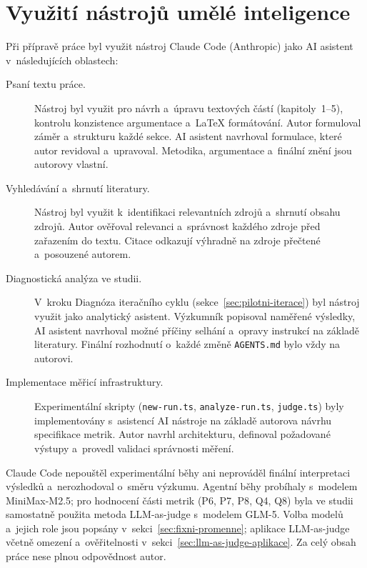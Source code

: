 \chapter{Využití nástrojů umělé inteligence}
\label{app:ai-disclosure}

Při přípravě práce byl využit nástroj Claude Code (Anthropic) jako
AI asistent v~následujících oblastech:

\begin{description}
    \item[Psaní textu práce.]
        Nástroj byl využit pro návrh a~úpravu textových částí
        (kapitoly~1--5), kontrolu konzistence argumentace a~LaTeX
        formátování. Autor formuloval záměr a~strukturu každé sekce.
        AI asistent navrhoval formulace, které autor revidoval
        a~upravoval. Metodika, argumentace a~finální znění jsou
        autorovy vlastní.

    \item[Vyhledávání a~shrnutí literatury.]
        Nástroj byl využit k~identifikaci relevantních zdrojů
        a~shrnutí obsahu zdrojů. Autor ověřoval relevanci a~správnost
        každého zdroje před zařazením do textu. Citace odkazují
        výhradně na zdroje přečtené a~posouzené autorem.

    \item[Diagnostická analýza ve studii.]
        V~kroku Diagnóza iteračního cyklu (sekce~\ref{sec:pilotni-iterace})
        byl nástroj využit jako analytický asistent. Výzkumník
        popisoval naměřené výsledky, AI asistent navrhoval možné
        příčiny selhání a~opravy instrukcí na základě literatury.
        Finální rozhodnutí o~každé změně \texttt{AGENTS.md} bylo
        vždy na autorovi.

    \item[Implementace měřicí infrastruktury.]
        Experimentální skripty (\texttt{new-\allowbreak run.ts},
        \texttt{analyze-\allowbreak run.ts}, \texttt{judge.ts}) byly
        implementovány s~asistencí AI nástroje na základě autorova
        návrhu specifikace metrik. Autor navrhl architekturu,
        definoval požadované výstupy a~provedl validaci správnosti
        měření.
\end{description}

\noindent
Claude Code nepouštěl experimentální běhy ani neprováděl finální
interpretaci výsledků a~nerozhodoval o~směru výzkumu. Agentní běhy
probíhaly s~modelem MiniMax-M2.5; pro hodnocení části metrik
(\acs{P6}, \acs{P7}, \acs{P8}, \acs{Q4}, \acs{Q8}) byla ve studii
samostatně použita metoda LLM-as-judge s~modelem GLM-5. Volba modelů
a~jejich role jsou popsány v~sekci~\ref{sec:fixni-promenne};
aplikace LLM-as-judge včetně omezení a~ověřitelnosti
v~sekci~\ref{sec:llm-as-judge-aplikace}. Za celý obsah práce nese
plnou odpovědnost autor.
